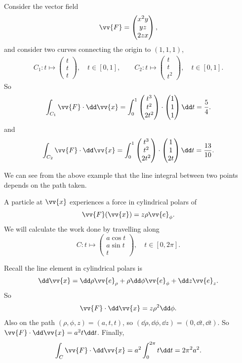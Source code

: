 \begin{example}
	\label{ex:q}
	Consider the vector field 
	$$
	\vv{F} = \begin{pmatrix}
		x^2 y \\ yz \\ 2zx
	\end{pmatrix},
	$$
	and consider two curves connecting the origin to $(1, 1, 1)$,
	\begin{align*}
		C_1: t \longmapsto \begin{pmatrix}
			t \\ t\\ t
		\end{pmatrix}, \quad t \in [0, 1], \quad \quad
		C_2: t \longmapsto \begin{pmatrix}
			t \\ t\\ t^2
		\end{pmatrix}, \quad t \in [0, 1].
	\end{align*}
	So
	$$
	\int_{C_1} \vv{F} \cdot \dd \vv{x}= \int_0^1 \begin{pmatrix}
		t^3 \\ t^2\\ 2t^2
	\end{pmatrix} \cdot \begin{pmatrix}
		1 \\ 1\\ 1
	\end{pmatrix} \dd t = \frac{5}{4}.
	$$
	and
	$$
	\int_{C_2} \vv{F} \cdot \dd \vv{x}= \int_0^1 \begin{pmatrix}
		t^3 \\ t^2\\ 2t^2
	\end{pmatrix} \cdot \begin{pmatrix}
		1 \\ 1\\ 2t
	\end{pmatrix} \dd t = \frac{13}{10}.
	$$
\end{example}

We can see from the above example that the line integral between two points depends on the path taken.

\begin{example}
	A particle at $\vv{x}$ experiences a force in cylindrical polars of
	$$
	\vv{F}(\vv{x}) = z \rho \vv{e}_{\phi}.
	$$
	We will calculate the work done by travelling along
	$$
	C: t \longmapsto \begin{pmatrix}
		a \cos t \\ a \sin t \\ t
	\end{pmatrix}, \quad t \in [0, 2\pi].
	$$

	Recall the line element in cylindrical polars is
	$$
	\dd \vv{x} = \dd \rho \vv{e}_{\rho} + \rho \dd \phi \vv{e}_{\phi} + \dd z \vv{e}_z.
	$$
	So
	$$
\vv{F} \cdot \dd \vv{x} = z \rho^2 \dd \phi.
	$$
	Also on the path $(\rho, \phi, z) = (a, t, t)$, so $(\dd \rho, \dd \phi, \dd z) = (0, \dd t, \dd t)$. So $\vv{F} \cdot \dd \vv{x} = a^2 t \dd t$. Finally,
	$$
	\int_C \vv{F} \cdot \dd \vv{x} = a^2 \int_0^{2 \pi} t \dd t = 2 \pi^2 a^2.
	$$
\end{example}

